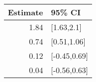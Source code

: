 \begin{tabular}{rl}
  \hline
Estimate & 95\% CI \\ 
  \hline
1.84 & [1.63,2.1] \\ 
  0.74 & [0.51,1.06] \\ 
  0.12 & [-0.45,0.69] \\ 
  0.04 & [-0.56,0.63] \\ 
   \hline
\end{tabular}

